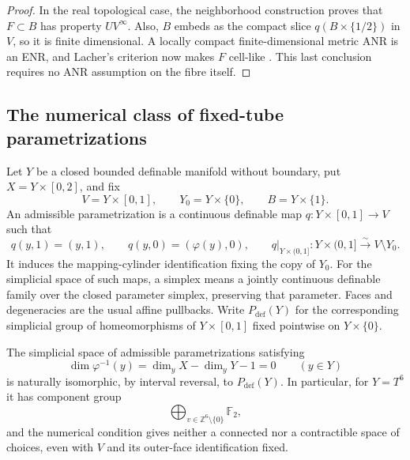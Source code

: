 \begin{proof}
In the real topological case, the neighborhood construction proves
that $F\subset B$ has property $UV^\infty$.
Also, $B$ embeds as the compact slice $q(B\times\{1/2\})$ in $V$,
so it is finite dimensional.  A locally compact finite-dimensional
metric ANR is an ENR, and Lacher's criterion now makes $F$ cell-like
\cite[preliminary lemma, p.~718, and Theorem~1.1, p.~719]
{Lacher1969CellLike}.  This last conclusion requires no ANR
assumption on the fibre itself.
\end{proof}

\subsection{The numerical class of fixed-tube parametrizations}

Let $Y$ be a closed bounded definable manifold without boundary,
put $X=Y\times[0,2]$, and fix
\[
 V=Y\times[0,1],\qquad Y_0=Y\times\{0\},\qquad B=Y\times\{1\}.
\]
An admissible parametrization is a continuous definable map
$q:Y\times[0,1]\to V$ such that
\[
 q(y,1)=(y,1),\qquad q(y,0)=(\varphi(y),0),\qquad
 q|_{Y\times(0,1]}:Y\times(0,1]\xrightarrow{\sim}V\setminus Y_0.
\]
It induces the mapping-cylinder identification fixing the copy of
$Y_0$.  For the simplicial space of such maps, a simplex means a
jointly continuous definable family over the closed parameter
simplex, preserving that parameter.  Faces and degeneracies are
the usual affine pullbacks.  Write $P_{\mathrm{def}}(Y)$ for the
corresponding simplicial group of homeomorphisms of $Y\times[0,1]$
fixed pointwise on $Y\times\{0\}$.

\begin{theorem}\label{thm:numerical-tube-concordances}
The simplicial space of admissible parametrizations satisfying
\[
 \dim\varphi^{-1}(y)=\dim_yX-\dim_yY-1=0\qquad(y\in Y)
\]
is naturally isomorphic, by interval reversal, to
$P_{\mathrm{def}}(Y)$.  In particular, for $Y=T^6$ it has component
group
\[
 \bigoplus_{v\in\mathbb Z^6\setminus\{0\}}\mathbb F_2,
\]
and the numerical condition gives neither a connected nor a
contractible space of choices, even with $V$ and its outer-face
identification fixed.
\end{theorem}

